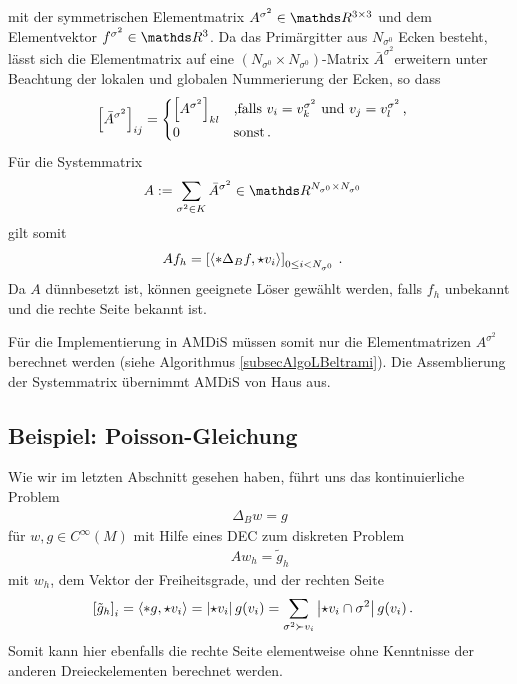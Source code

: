     mit der symmetrischen Elementmatrix \( A^{\sigma^{2}} \in \R^{3 \times 3} \) 
    und dem Elementvektor \( f^{\sigma^{2}}\in\R^{3} \).
    Da das Primärgitter aus \( N_{\sigma^{0}} \) Ecken besteht,
    lässt sich die Elementmatrix auf eine \mbox{\( ( N_{\sigma^{0}} \times N_{\sigma^{0}} ) \)-Matrix}
    \( \bar{A}^{\sigma^{2}} \)erweitern 
    unter Beachtung
    der lokalen und globalen Nummerierung der Ecken, so dass
    \begin{align}
      \left[ \bar{A}^{\sigma^{2}} \right]_{ij}
        &= 
          \begin{cases}
            \left[ A^{\sigma^{2}} \right]_{kl} & \text{,falls } v_{i} = v^{\sigma^{2}}_{k}
                                                 \text{ und }   v_{j} = v^{\sigma^{2}}_{l} \,\text{,} \\
            0 & \text{sonst} \,\text{.}
          \end{cases}
    \end{align}
    Für die Systemmatrix
    \begin{align}
      A &:= \sum_{\sigma^{2}\in K} \bar{A}^{\sigma^{2}} \in \R^{N_{\sigma^{0}}\times N_{\sigma^{0}}}
    \end{align}
    gilt somit
    \begin{align}
      A f_{h} &= \left[ \left\langle *\Delta_{B} f, \star v_{i}  \right\rangle\right]_{0 \le i < N_{\sigma^{0}}} \,\text{.}
    \end{align}
    Da \( A \) dünnbesetzt ist, können geeignete Löser gewählt werden, 
    falls \( f_{h} \) unbekannt und die rechte Seite bekannt ist.

    Für die Implementierung in AMDiS müssen somit nur die Elementmatrizen \( A^{\sigma^{2}} \) berechnet
    werden (siehe Algorithmus \ref{subsecAlgoLBeltrami}). 
    Die Assemblierung der Systemmatrix übernimmt AMDiS von Haus aus. 
  
  \subsection{Beispiel: Poisson-Gleichung}
    Wie wir im letzten Abschnitt gesehen haben, führt uns das kontinuierliche Problem
    \begin{align}
      \Delta_{B} w = g
    \end{align}
    für \( w,g \in C^{\infty}(M) \) mit Hilfe eines DEC zum diskreten Problem
    \begin{align}
      A w_{h} = \tilde{g}_{h}
    \end{align}
    mit \( w_{h} \), dem Vektor der Freiheitsgrade, und der rechten Seite
    \begin{align}
      \left[ \tilde{g}_{h} \right]_{i} &= \left\langle *g , \star v_{i} \right\rangle
            = \left| \star v_{i} \right| g(v_{i})
            = \sum_{\sigma^{2}\succ v_{i}} \left| \star v_{i} \cap \sigma^{2} \right| g(v_{i}) \,\text{.}
    \end{align}
    Somit kann hier ebenfalls die rechte Seite elementweise ohne Kenntnisse der anderen Dreieckelementen
    berechnet werden.
    
